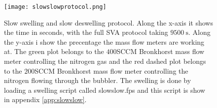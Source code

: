 \documentclass[MasterThesisMain.tex]{subfiles}
\begin{document}
\begin{figure}
\centering
\texttt{[image: slowslowprotocol.png]}
\caption{Slow swelling and slow deswelling protocol. Along the x-axis it shows the time in seconds, with the full SVA protocol taking $\SI{9500}{\second}$. Along the y-axis i show the precentage the mass flow meters are working at. The green plot belongs to the $400$SCCM Bronkhorst mass flow meter controlling the nitrogen gas and the red dashed plot belongs to the $200$SCCM Bronkhorst mass flow meter controlling the nitrogen flowing through the bubbler. The swelling is done by loading a swelling script called slowslow.fps and this script is show in appendix \ref{app:slowslow}.}
\label{fig:slowslow}
\end{figure}
   
\end{document}

